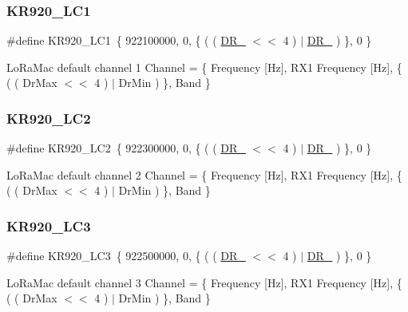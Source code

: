 \subsubsection{\texorpdfstring{K\+R920\+\_\+\+L\+C1}{KR920\_LC1}}
{\footnotesize\ttfamily \#define K\+R920\+\_\+\+L\+C1~\{ 922100000, 0, \{ ( ( \hyperlink{group__REGION_ga872e12c82020c02a7f70a1c6ed1375df}{D\+R\+\_} $<$$<$ 4 ) $\vert$ \hyperlink{group__REGION_ga6c4ef966b4f3d5eb7597b087f2b97095}{D\+R\+\_} ) \}, 0 \}}

Lo\+Ra\+Mac default channel 1 Channel = \{ Frequency \mbox{[}Hz\mbox{]}, R\+X1 Frequency \mbox{[}Hz\mbox{]}, \{ ( ( Dr\+Max $<$$<$ 4 ) $\vert$ Dr\+Min ) \}, Band \} \mbox{\label{group__REGIONKR920_ga1253892583b3997c9fd45c2a0934fa78}} 
\subsubsection{\texorpdfstring{K\+R920\+\_\+\+L\+C2}{KR920\_LC2}}
{\footnotesize\ttfamily \#define K\+R920\+\_\+\+L\+C2~\{ 922300000, 0, \{ ( ( \hyperlink{group__REGION_ga872e12c82020c02a7f70a1c6ed1375df}{D\+R\+\_} $<$$<$ 4 ) $\vert$ \hyperlink{group__REGION_ga6c4ef966b4f3d5eb7597b087f2b97095}{D\+R\+\_} ) \}, 0 \}}

Lo\+Ra\+Mac default channel 2 Channel = \{ Frequency \mbox{[}Hz\mbox{]}, R\+X1 Frequency \mbox{[}Hz\mbox{]}, \{ ( ( Dr\+Max $<$$<$ 4 ) $\vert$ Dr\+Min ) \}, Band \} \mbox{\label{group__REGIONKR920_gac8d050d9705d659f5b5977beaf53f5a0}} 
\subsubsection{\texorpdfstring{K\+R920\+\_\+\+L\+C3}{KR920\_LC3}}
{\footnotesize\ttfamily \#define K\+R920\+\_\+\+L\+C3~\{ 922500000, 0, \{ ( ( \hyperlink{group__REGION_ga872e12c82020c02a7f70a1c6ed1375df}{D\+R\+\_} $<$$<$ 4 ) $\vert$ \hyperlink{group__REGION_ga6c4ef966b4f3d5eb7597b087f2b97095}{D\+R\+\_} ) \}, 0 \}}

Lo\+Ra\+Mac default channel 3 Channel = \{ Frequency \mbox{[}Hz\mbox{]}, R\+X1 Frequency \mbox{[}Hz\mbox{]}, \{ ( ( Dr\+Max $<$$<$ 4 ) $\vert$ Dr\+Min ) \}, Band \} \mbox{\label{group__REGIONKR920_ga1b3db0e7a3e9d4126c6ffa3731a50a34}} 
